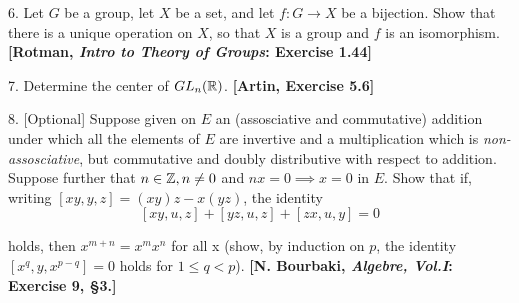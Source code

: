 \documentclass{article}
\begin{document}
\vspace{2.5mm}
\noindent

6. Let $G$ be a group, let $X$ be a set, and let $f: G \to X$ be a bijection. Show that there is a unique operation on $X$, so that $X$ is a group and $f$ is an isomorphism. \textbf{[Rotman, \textit{Intro to Theory of Groups}: Exercise 1.44]}

\vspace{2.5mm}
\noindent

7. Determine the center of $GL_{n}(\mathbb{R})$. \textbf{[Artin, Exercise 5.6]}

\vspace{2.5mm}
\noindent

8. [Optional] Suppose given on $E$ an (assosciative and commutative) addition under which all the elements of $E$ are invertive and a multiplication which is \textit{non-assosciative}, but commutative and doubly distributive with respect to addition. Suppose further that $n \in \mathbb{Z}, n\neq 0$ and $nx=0 \implies x=0$ in $E$. Show that if, writing $[xy, y, z] = (xy)z - x(yz)$, the identity
\[ [xy,u,z] + [yz,u,z] + [zx,u,y] = 0 \]

holds, then $x^{m+n} = x^{m}x^{n}$ for all x (show, by induction on $p$, the identity $[x^{q},y, x^{p-q}]=0$ holds for $1 \leq q < p$). \textbf{[N. Bourbaki, \textit{Algebre, Vol.I}: Exercise 9, \S 3.]}
\end{document}
